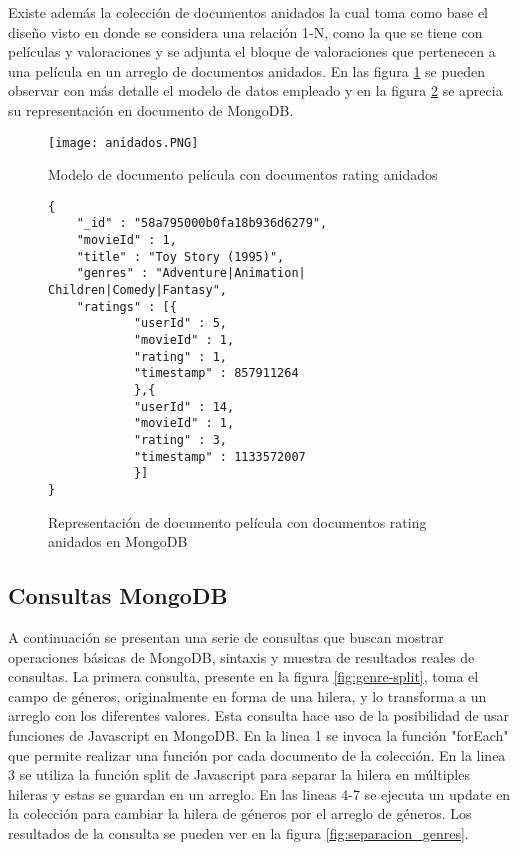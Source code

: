 \documentclass[conference,compsoc]{sty/IEEEtran}
\begin{document}
Existe además la colección de documentos anidados la cual toma como base el diseño visto en \cite{VeraBoa} donde se considera una relación 1-N, como la que se tiene con películas y valoraciones y se adjunta el bloque de valoraciones que pertenecen a una película en un arreglo de documentos anidados. En las figura \ref{fig:documento-anidado} se pueden observar con más detalle el modelo de datos empleado y en la figura \ref{fig:documento-anidado-Mongo} se aprecia su representación en documento de MongoDB.

\begin{figure}
\begin{center}
\texttt{[image: anidados.PNG]}
\end{center}
\caption{Modelo de documento película con documentos rating anidados} 
\label{fig:documento-anidado}
\end{figure}

\begin{figure}
    \begin{verbatim}
{
	"_id" : "58a795000b0fa18b936d6279",
	"movieId" : 1,
	"title" : "Toy Story (1995)",
	"genres" : "Adventure|Animation| Children|Comedy|Fantasy",
	"ratings" : [{
			"userId" : 5,
			"movieId" : 1,
			"rating" : 1,
			"timestamp" : 857911264
			},{
			"userId" : 14,
			"movieId" : 1,
			"rating" : 3,
			"timestamp" : 1133572007
			}]
}

\end{verbatim}
\caption{Representación de documento película con documentos rating anidados en MongoDB} 
\label{fig:documento-anidado-Mongo}
\end{figure}


\subsection{Consultas MongoDB} %
A continuación se presentan una serie de consultas que buscan mostrar operaciones básicas de MongoDB, sintaxis y muestra de resultados reales de consultas. La primera consulta, presente en la figura \ref{fig:genre-split}, toma el campo de géneros, originalmente en forma de una hilera, y lo transforma a un arreglo con los diferentes valores. Esta consulta hace uso de la posibilidad de usar funciones de Javascript en MongoDB. En la linea 1 se invoca la función "forEach" que permite realizar una función por cada documento de la colección. En la linea 3 se utiliza la función split de Javascript para separar la hilera en múltiples hileras y estas se guardan en un arreglo. En las lineas 4-7 se ejecuta un update en la colección para cambiar la hilera de géneros por el arreglo de géneros. Los resultados de la consulta se pueden ver en la figura \ref{fig:separacion_genres}.
\end{document}
